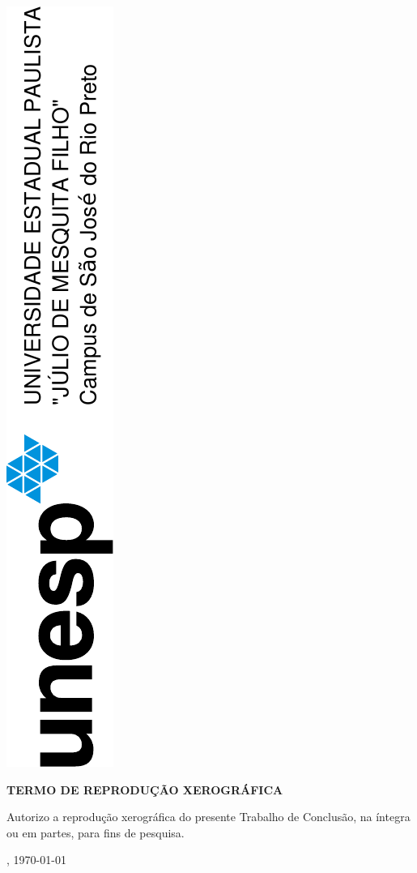 \thispagestyle{empty}
\center
\centering \includegraphics[angle=-90]{unesp.pdf}
\vspace{2cm}

\begin{vplace}[1]
\par \centering \ABNTEXchapterfont\large
		\bfseries{ TERMO DE REPRODUÇÃO XEROGRÁFICA }
\end{vplace}

\begin{vplace}[1]
	\par \ABNTEXchapterfont Autorizo a reprodução xerográfica do presente Trabalho de Conclusão, na íntegra ou em partes, para fins de pesquisa.
\end{vplace}

\begin{vplace}[1]
	\begin{center}
		\ABNTEXchapterfont \imprimirlocal, \today
		\ABNTEXchapterfont \assinatura{\imprimirautor}
	\end{center}
\end{vplace}



